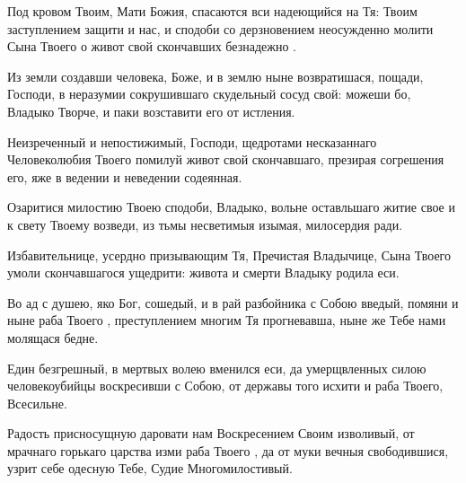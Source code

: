 \begin{mymulticols}
\inyne

Под кровом Твоим, Мати Божия, спасаются вси надеющийся на Тя: Твоим заступлением защити и нас, и сподоби со дерзновением неосужденно молити Сына Твоего о живот свой скончавших безнадежно . 




Из земли создавши человека, Боже, и в землю ныне возвратишася, пощади, Господи, в неразумии сокрушившаго скудельный сосуд свой: можеши бо, Владыко Творче, и паки возставити его от истления.


Неизреченный и непостижимый, Господи, щедротами несказаннаго Человеколюбия Твоего помилуй живот свой скончавшаго, презирая согрешения его, яже в ведении и неведении содеянная.

\slava

Озаритися милостию Твоею сподоби, Владыко, вольне оставльшаго  житие свое и к свету Твоему возведи, из тьмы несветимыя изымая, милосердия ради.

\inyne

Избавительнице, усердно призывающим Тя, Пречистая Владычице, Сына Твоего умоли скончавшагося  ущедрити: живота и смерти Владыку родила еси. 




Во ад с душею, яко Бог, сошедый, и в рай разбойника с Собою введый, помяни и ныне раба Твоего , преступлением многим Тя прогневавша, ныне же Тебе нами молящася бедне.


Един безгрешный, в мертвых волею вменился еси, да умерщвленных силою человекоубийцы воскресивши с Собою, от державы того исхити и раба Твоего, Всесильне.

\slava

Радость присносущную даровати нам Воскресением Своим изволивый, от мрачнаго горькаго царства изми раба Твоего , да от муки вечныя свободившися, узрит себе одесную Тебе, Судие Многомилостивый.


\end{mymulticols}
